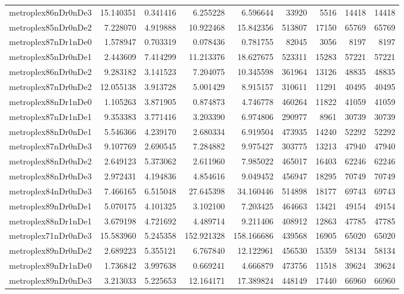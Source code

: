 \begin{longtable}{|l|r|r|r|r|r|r|r|r|}
metroplex86nDr0nDe3 & 15.140351 & 0.341416 & 6.255228 & 6.596644 & 33920 & 5516 & 14418 & 14418 \\
metroplex85nDr0nDe2 & 7.228070 & 4.919888 & 10.922468 & 15.842356 & 513807 & 17150 & 65769 & 65769 \\
metroplex87nDr1nDe0 & 1.578947 & 0.703319 & 0.078436 & 0.781755 & 82045 & 3056 & 8197 & 8197 \\
metroplex85nDr0nDe1 & 2.443609 & 7.414299 & 11.213376 & 18.627675 & 523311 & 15283 & 57221 & 57221 \\
metroplex86nDr0nDe2 & 9.283182 & 3.141523 & 7.204075 & 10.345598 & 361964 & 13126 & 48835 & 48835 \\
metroplex87nDr0nDe2 & 12.055138 & 3.913728 & 5.001429 & 8.915157 & 310611 & 11291 & 40495 & 40495 \\
metroplex88nDr1nDe0 & 1.105263 & 3.871905 & 0.874873 & 4.746778 & 460264 & 11822 & 41059 & 41059 \\
metroplex87nDr1nDe1 & 9.353383 & 3.771416 & 3.203390 & 6.974806 & 290977 & 8961 & 30739 & 30739 \\
metroplex88nDr0nDe1 & 5.546366 & 4.239170 & 2.680334 & 6.919504 & 473935 & 14240 & 52292 & 52292 \\
metroplex87nDr0nDe3 & 9.107769 & 2.690545 & 7.284882 & 9.975427 & 303775 & 13213 & 47940 & 47940 \\
metroplex88nDr0nDe2 & 2.649123 & 5.373062 & 2.611960 & 7.985022 & 465017 & 16403 & 62246 & 62246 \\
metroplex88nDr0nDe3 & 2.972431 & 4.194836 & 4.854616 & 9.049452 & 456947 & 18295 & 70749 & 70749 \\
metroplex84nDr0nDe3 & 7.466165 & 6.515048 & 27.645398 & 34.160446 & 514898 & 18177 & 69743 & 69743 \\
metroplex89nDr0nDe1 & 5.070175 & 4.101325 & 3.102100 & 7.203425 & 464663 & 13421 & 49154 & 49154 \\
metroplex88nDr1nDe1 & 3.679198 & 4.721692 & 4.489714 & 9.211406 & 408912 & 12863 & 47785 & 47785 \\
metroplex71nDr0nDe3 & 15.583960 & 5.245358 & 152.921328 & 158.166686 & 439568 & 16905 & 65020 & 65020 \\
metroplex89nDr0nDe2 & 2.689223 & 5.355121 & 6.767840 & 12.122961 & 456530 & 15359 & 58134 & 58134 \\
metroplex89nDr1nDe0 & 1.736842 & 3.997638 & 0.669241 & 4.666879 & 473756 & 11518 & 39624 & 39624 \\
metroplex89nDr0nDe3 & 3.213033 & 5.225653 & 12.164171 & 17.389824 & 448149 & 17440 & 66960 & 66960 \\

\end{longtable}
